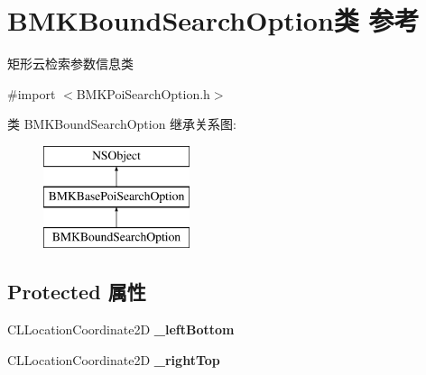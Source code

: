 \hypertarget{interface_b_m_k_bound_search_option}{}\section{B\+M\+K\+Bound\+Search\+Option类 参考}
\label{interface_b_m_k_bound_search_option}


矩形云检索参数信息类  




{\ttfamily \#import $<$B\+M\+K\+Poi\+Search\+Option.\+h$>$}

类 B\+M\+K\+Bound\+Search\+Option 继承关系图\+:\begin{figure}[H]
\begin{center}
\leavevmode
\includegraphics[height=3.000000cm]{interface_b_m_k_bound_search_option}
\end{center}
\end{figure}
\subsection*{Protected 属性}
\begin{DoxyCompactItemize}
\item 
\hypertarget{interface_b_m_k_bound_search_option_a439e395186d7cb9f72bb2cea6c112a26}{}C\+L\+Location\+Coordinate2\+D {\bfseries \+\_\+left\+Bottom}\label{interface_b_m_k_bound_search_option_a439e395186d7cb9f72bb2cea6c112a26}

\item 
\hypertarget{interface_b_m_k_bound_search_option_a4bd165343e4ea38ceabb6da210c90793}{}C\+L\+Location\+Coordinate2\+D {\bfseries \+\_\+right\+Top}\label{interface_b_m_k_bound_search_option_a4bd165343e4ea38ceabb6da210c90793}

\end{DoxyCompactItemize}
